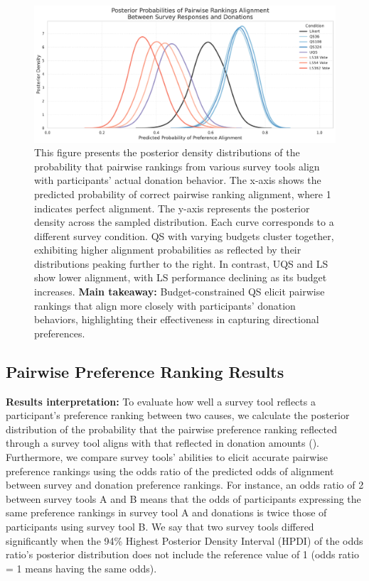 \begin{figure}[h]
    \centering
    \includegraphics[width=\textwidth]{content/image/overlapping_density_custom_palette.pdf}
    \caption[]{
    This figure presents the posterior density distributions of the probability that pairwise rankings from various survey tools align with participants' actual donation behavior. The x-axis shows the predicted probability of correct pairwise ranking alignment, where 1 indicates perfect alignment. The y-axis represents the posterior density across the sampled distribution. Each curve corresponds to a different survey condition. QS with varying budgets cluster together, exhibiting higher alignment probabilities as reflected by their distributions peaking further to the right. In contrast, UQS and LS show lower alignment, with LS performance declining as its budget increases. \textbf{Main takeaway:} Budget-constrained QS elicit pairwise rankings that align more closely with participants' donation behaviors, highlighting their effectiveness in capturing directional preferences.}
    \label{fig:ranking_posterior}
\end{figure}

\subsection{Pairwise Preference Ranking Results}
\label{sec:result_1}

\textbf{Results interpretation: }To evaluate how well a survey tool reflects a participant's preference ranking between two causes, we calculate the posterior distribution of the probability that the pairwise preference ranking reflected through a survey tool aligns with that reflected in donation amounts (). Furthermore, we compare survey tools' abilities to elicit accurate pairwise preference rankings using the odds ratio of the predicted odds of alignment between survey and donation preference rankings. For instance, an odds ratio of 2 between survey tools A and B means that the odds of participants expressing the same preference rankings in survey tool A and donations is twice those of participants using survey tool B. We say that two survey tools differed significantly when the 94\% Highest Posterior Density Interval (HPDI) of the odds ratio's posterior distribution does not include the reference value of 1 (odds ratio = 1 means having the same odds). 

